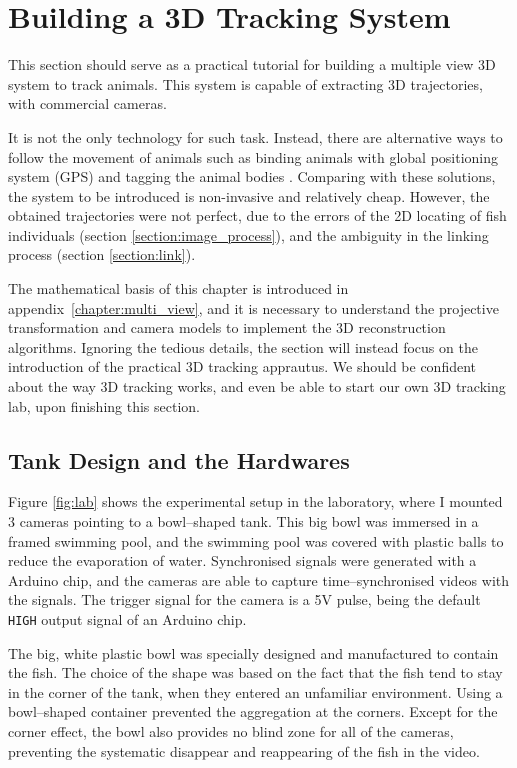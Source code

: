 \documentclass[11pt,twoside]{report}
\begin{document}
\section{Building a 3D Tracking System}

This section should serve as a practical tutorial for building a multiple view 3D system to track animals. This system is capable of extracting 3D trajectories, with commercial cameras.

It is not the only technology for such task. Instead, there are alternative ways to follow the movement of animals such as binding animals with global positioning system (GPS) \cite{nagy2010} and tagging the animal bodies \cite{jolles2017}. Comparing with these solutions, the system to be introduced is non-invasive and relatively cheap. However, the obtained trajectories were not perfect, due to the errors of the 2D locating of fish individuals (section \ref{section:image_process}), and the ambiguity in the linking process (section \ref{section:link}).

The mathematical basis of this chapter is introduced in appendix~\ref{chapter:multi_view}, and it is necessary to understand the projective transformation and camera models to implement the 3D reconstruction algorithms. Ignoring the tedious details, the section will instead focus on the introduction of the practical 3D tracking apprautus. We should be confident about the way 3D tracking works, and even be able to start our own 3D tracking lab, upon finishing this section.

\subsection{Tank Design and the Hardwares}
\label{section:system_3d}

Figure \ref{fig:lab} shows the experimental setup in the laboratory, where I mounted 3 cameras pointing to a bowl--shaped tank. This big bowl was immersed in a framed swimming pool, and the swimming pool was covered with plastic balls to reduce the evaporation of water. Synchronised signals were generated with a Arduino chip, and the cameras are able to capture time--synchronised videos with the signals. The trigger signal for the camera is a 5V pulse, being the default \texttt{HIGH} output signal of an Arduino chip.


The big, white plastic bowl was specially designed and manufactured to contain the fish. The choice of the shape was based on the fact that the fish tend to stay in the corner of the tank, when they entered an unfamiliar environment. Using a bowl--shaped container prevented the aggregation at the corners. Except for the corner effect, the bowl also provides no blind zone for all of the cameras, preventing the systematic disappear and reappearing of the fish in the video.
\end{document}

